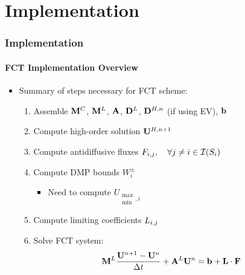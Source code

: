\documentclass{beamer}
\begin{document}
\section{Implementation}
\begin{frame}
\frametitle{Implementation}
\framesubtitle{FCT Implementation Overview}

\begin{itemize}
   \item Summary of steps necessary for FCT scheme:
      \begin{enumerate}
         \item Assemble $\mathbf{M}^C$, $\mathbf{M}^L$, $\mathbf{A}$, $\mathbf{D}^L$, $\mathbf{D}^{H,n}$ (if using EV), $\mathbf{b}$
         \item Compute high-order solution $\mathbf{U}^{H,n+1}$
         \item Compute antidiffusive fluxes $F_{i,j},\quad\forall j\ne i
            \in\mathcal{I}(S_i)$
         \item Compute DMP bounds $W_i^\pm$
            \begin{itemize}
               \item Need to compute $U_{\substack{\max\\\min},i}$
            \end{itemize}
         \item Compute limiting coefficients $L_{i,j}$
         \item Solve FCT system:
            \begin{equation}
               \mathbf{M}^L\frac{\mathbf{U}^{n+1}-\mathbf{U}^n}{\Delta t} + \mathbf{A}^L\mathbf{U}^n = \mathbf{b} + \mathbf{L}\cdot\mathbf{F}
            \end{equation}
      \end{enumerate}
\end{itemize}

\end{frame}
\end{document}
